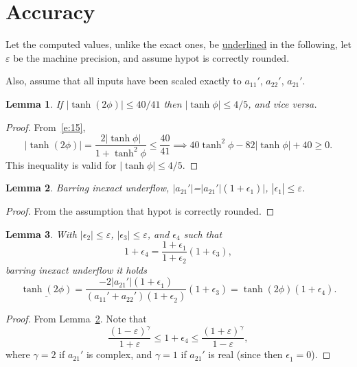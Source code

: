 \documentclass[a4paper,12pt,twoside]{article}
\newtheorem{lem}{Lemma}
\begin{document}
\section{Accuracy}
Let the computed values, unlike the exact ones, be
\underline{underlined} in the following, let $\varepsilon$ be the
machine precision, and assume $\mathrm{hypot}$ is correctly rounded.

Also, assume that all inputs have been scaled exactly to $a_{11}'$,
$a_{22}'$, $a_{21}'$.

\begin{lem}\label{l:1}
  If $|\tanh(2\phi)|\le 40/41$ then $|\tanh\phi|\le 4/5$, and vice
  versa.
\end{lem}
\begin{proof}
  From~\eqref{e:15},
  \begin{displaymath}
    |\tanh(2\phi)|=\frac{2|\tanh\phi|}{1+\tanh^2\phi}\le\frac{40}{41}\implies
    40\tanh^2\phi-82|\tanh\phi|+40\ge 0.
  \end{displaymath}
  This inequality is valid for $|\tanh\phi|\le 4/5$.
\end{proof}

\begin{lem}\label{l:2}
  Barring inexact underflow,
  \underline{$|a_{21}'|$}=$|a_{21}'|(1+\epsilon_1^{})|$,
  $|\epsilon_1^{}|\le\varepsilon$.
\end{lem}
\begin{proof}
  From the assumption that $\mathrm{hypot}$ is correctly rounded.
\end{proof}

\begin{lem}\label{l:3}
  With $|\epsilon_2|\le\varepsilon$, $|\epsilon_3|\le\varepsilon$, and
  $\epsilon_4$ such that
  \begin{displaymath}
    1+\epsilon_4=\frac{1+\epsilon_1}{1+\epsilon_2}(1+\epsilon_3),
  \end{displaymath}
  barring inexact underflow it holds
  \begin{displaymath}
    \underline{\tanh(2\phi)}=\frac{-2|a_{21}'|(1+\epsilon_1^{})}{(a_{11}'+a_{22}')(1+\epsilon_2^{})}(1+\epsilon_3^{})=\tanh(2\phi)(1+\epsilon_4^{}).
  \end{displaymath}
\end{lem}
\begin{proof}
  From Lemma~\ref{l:2}.  Note that
  \begin{equation}
    \frac{(1-\varepsilon)^{\gamma}}{1+\varepsilon}\le 1+\epsilon_4\le\frac{(1+\varepsilon)^{\gamma}}{1-\varepsilon},
    \label{e:21}
  \end{equation}
  where $\gamma=2$ if $a_{21}'$ is complex, and $\gamma=1$ if
  $a_{21}'$ is real (since then $\epsilon_1^{}=0$).
\end{proof}
\end{document}
